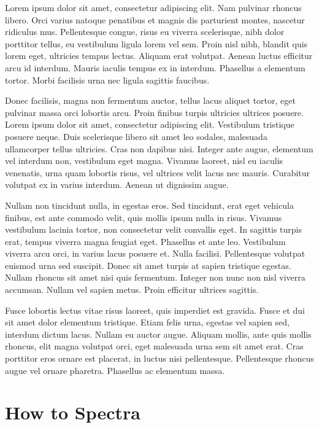 Lorem ipsum dolor sit amet, consectetur adipiscing elit. Nam pulvinar rhoncus libero. Orci varius natoque penatibus et magnis dis parturient montes, nascetur ridiculus mus. Pellentesque congue, risus eu viverra scelerisque, nibh dolor porttitor tellus, eu vestibulum ligula lorem vel sem. Proin nisl nibh, blandit quis lorem eget, ultricies tempus lectus. Aliquam erat volutpat. Aenean luctus efficitur arcu id interdum. Mauris iaculis tempus ex in interdum. Phasellus a elementum tortor. Morbi facilisis urna nec ligula sagittis faucibus.

Donec facilisis, magna non fermentum auctor, tellus lacus aliquet tortor, eget pulvinar massa orci lobortis arcu. Proin finibus turpis ultricies ultrices posuere. Lorem ipsum dolor sit amet, consectetur adipiscing elit. Vestibulum tristique posuere neque. Duis scelerisque libero sit amet leo sodales, malesuada ullamcorper tellus ultricies. Cras non dapibus nisi. Integer ante augue, elementum vel interdum non, vestibulum eget magna. Vivamus laoreet, nisl eu iaculis venenatis, urna quam lobortis risus, vel ultrices velit lacus nec mauris. Curabitur volutpat ex in varius interdum. Aenean ut dignissim augue.

Nullam non tincidunt nulla, in egestas eros. Sed tincidunt, erat eget vehicula finibus, est ante commodo velit, quis mollis ipsum nulla in risus. Vivamus vestibulum lacinia tortor, non consectetur velit convallis eget. In sagittis turpis erat, tempus viverra magna feugiat eget. Phasellus et ante leo. Vestibulum viverra arcu orci, in varius lacus posuere et. Nulla facilisi. Pellentesque volutpat euismod urna sed suscipit. Donec sit amet turpis at sapien tristique egestas. Nullam rhoncus sit amet nisi quis fermentum. Integer non nunc non nisl viverra accumsan. Nullam vel sapien metus. Proin efficitur ultrices sagittis.

Fusce lobortis lectus vitae risus laoreet, quis imperdiet est gravida. Fusce et dui sit amet dolor elementum tristique. Etiam felis urna, egestas vel sapien sed, interdum dictum lacus. Nullam eu auctor augue. Aliquam mollis, ante quis mollis rhoncus, elit magna volutpat orci, eget malesuada urna sem sit amet erat. Cras porttitor eros ornare est placerat, in luctus nisi pellentesque. Pellentesque rhoncus augue vel ornare pharetra. Phasellus ac elementum massa.



\section{How to Spectra}

